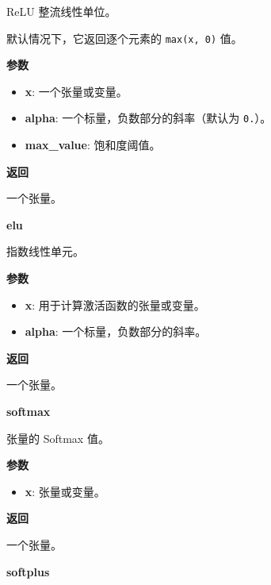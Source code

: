 ReLU 整流线性单位。

默认情况下，它返回逐个元素的 \texttt{max(x,\ 0)} 值。

\textbf{参数}

\begin{itemize}
\tightlist
\item
  \textbf{x}: 一个张量或变量。
\item
  \textbf{alpha}: 一个标量，负数部分的斜率（默认为 \texttt{0.}）。
\item
  \textbf{max\_value}: 饱和度阈值。
\end{itemize}

\textbf{返回}

一个张量。


\textbf{elu}\label{elu}

\begin{Shaded}
\begin{Highlighting}[]
\OperatorTok{=}\NormalTok{)}
\end{Highlighting}
\end{Shaded}

指数线性单元。

\textbf{参数}

\begin{itemize}
\tightlist
\item
  \textbf{x}: 用于计算激活函数的张量或变量。
\item
  \textbf{alpha}: 一个标量，负数部分的斜率。
\end{itemize}

\textbf{返回}

一个张量。


\textbf{softmax}\label{softmax}

\begin{Shaded}
\begin{Highlighting}[]
\end{Highlighting}
\end{Shaded}

张量的 Softmax 值。

\textbf{参数}

\begin{itemize}
\tightlist
\item
  \textbf{x}: 张量或变量。
\end{itemize}

\textbf{返回}

一个张量。


\textbf{softplus}\label{softplus}

